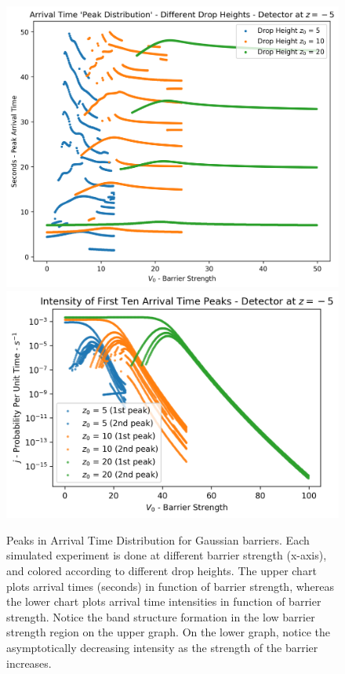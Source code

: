 \begin{figure}
    \centering
    \includegraphics[width=1\linewidth]{Figures//Yoshida/6663e0ce-fb89-4819-b390-3bad6ba0e3c4.png}
    \includegraphics[width=1\linewidth]{Figures//Yoshida/2897f6b7-dd93-43e5-8846-e3fb0f150b28.png}
    \caption{Peaks in Arrival Time Distribution for Gaussian barriers. Each simulated experiment is done at different barrier strength (x-axis), and colored according to different drop heights. The upper chart plots arrival times (seconds) in function of barrier strength, whereas the lower chart plots arrival time intensities in function of barrier strength. Notice the band structure formation in the low barrier strength region on the upper graph. On the lower graph, notice the asymptotically decreasing intensity as the strength of the barrier increases.}
    \label{fig:particklesupser_strength}
\end{figure}

